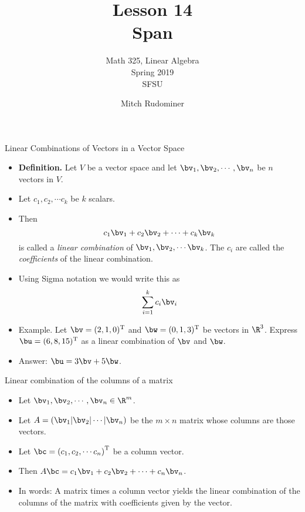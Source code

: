 \documentclass[handout]{beamer}
\title{Lesson 14 \\ Span}
\subtitle{Math 325, Linear Algebra \\ Spring 2019 \\ SFSU}
\author{Mitch Rudominer}
\date{}
\begin{document}
\begin{frame}
  \titlepage
\end{frame}

\begin{frame}{Linear Combinations of Vectors in a Vector Space}

\begin{itemize}
\item \textbf{Definition.} Let $V$ be a vector space and let $\bv_1,\bv_2,\cdots,\bv_n$ be $n$ vectors in $V$.
\item Let $c_1, c_2, \cdots c_k$ be $k$ scalars.
\item Then $$c_1 \bv_1 + c_2 \bv_2 + \cdots + c_k \bv_k$$ is
called a \emph{linear combination} of $\bv_1, \bv_2, \cdots \bv_k$.
The $c_i$ are called the \emph{coefficients} of the linear combination.
\item Using Sigma notation we would write this as
$$\sum_{i=1}^{k} c_i \bv_i$$
\item Example. Let $\bv = (2, 1, 0)^{\text{T}}$ and $\bw = (0, 1, 3)^{\text{T}}$ be vectors in $\R^3$.
Express $\bu = (6, 8, 15)^{\text{T}}$ as a linear combination of $\bv$ and $\bw$.
\item Answer: $\bu = 3 \bv + 5 \bw$.
\end{itemize}

\end{frame}

\begin{frame}{Linear combination of the columns of a matrix}

\begin{itemize}
\item Let $\bv_1,\bv_2,\cdots,\bv_n \in \R^m$.
\item Let $A =\left( \bv_1 \vert \bv_2 \vert \cdots \vert \bv_n \right)$
be the $m\times n$ matrix whose columns are those vectors.
\item Let $\bc = \left(c_1, c_2,\cdots c_n\right)^{\text{T}}$ be a column vector.
\item Then $A\bc = c_1\bv_1 + c_2\bv_2 + \cdots + c_n\bv_n$.
\item In words: A matrix times a column vector yields the linear
combination of the columns of the matrix with coefficients given by
the vector.
\end{itemize}

\end{frame}
\end{document}

